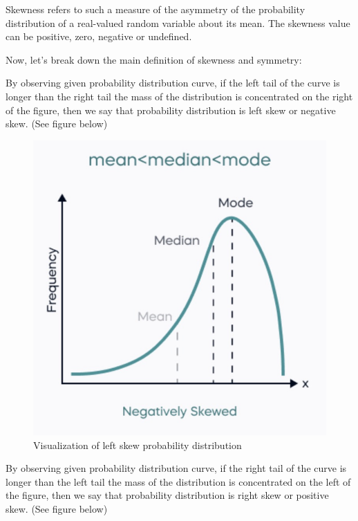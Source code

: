 \begin{definition}[Skewness]
Skewness refers to such a measure of the asymmetry of the probability distribution of a real-valued random variable about its mean. The skewness value can be positive, zero, negative or undefined.
\end{definition}

\noindent
Now, let's break down the main definition of skewness and symmetry:

\begin{definition}
By observing given probability distribution curve, if the left tail of the curve is longer than the right tail the mass of the distribution is concentrated on the right of the figure, then we say that probability distribution is left skew or negative skew. (See figure below)
\end{definition}

\begin{figure}[H]
 \centering
 \includegraphics[scale=0.45]{Section1/img/Leftskew.jpg}
 \caption{Visualization of left skew probability distribution}
\end{figure}

\begin{definition}
By observing given probability distribution curve, if the right tail of the curve is longer than the left tail the mass of the distribution is concentrated on the left of the figure, then we say that probability distribution is right skew or positive skew. (See figure below)
\end{definition}

